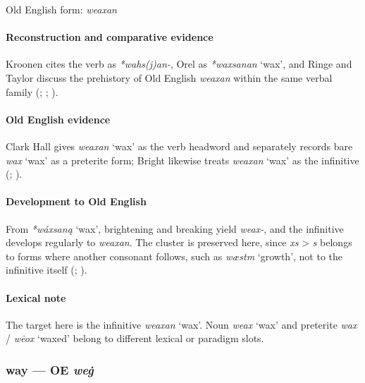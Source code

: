 \documentclass[
  british,
  a4paper,
]{article}
\providecommand{\Recon}[1]{\emph{*#1}}
\begin{document}
Old English form: \emph{weaxan}

\paragraph{Reconstruction and comparative
evidence}\label{reconstruction-and-comparative-evidence-73}

Kroonen cites the verb as \emph{*wahs(j)an-}, Orel as \Recon{waxsanan}
`wax', and Ringe and Taylor discuss the prehistory of Old English
\emph{weaxan} within the same verbal family
(; ; ).

\paragraph{Old English evidence}\label{old-english-evidence-75}

Clark Hall gives \emph{weaxan} `wax' as the verb headword and separately
records bare \emph{wax} `wax' as a preterite form; Bright likewise
treats \emph{weaxan} `wax' as the infinitive
(;
).

\paragraph{Development to Old
English}\label{development-to-old-english-74}

From \Recon{wáxsaną} `wax', brightening and breaking yield \emph{weax-},
and the infinitive develops regularly to \emph{weaxan}. The cluster is
preserved here, since \emph{xs} \textgreater{} \emph{s} belongs to forms
where another consonant follows, such as \emph{wæstm} `growth', not to
the infinitive itself (;
).

\paragraph{Lexical note}\label{lexical-note-3}

The target here is the infinitive \emph{weaxan} `wax'. Noun \emph{weax}
`wax' and preterite \emph{wax} / \emph{wēox} `waxed' belong to different
lexical or paradigm slots.

\subsubsection{\texorpdfstring{way --- OE
\emph{weġ}}{way --- OE weġ}}\label{way-oe-weux121}
\end{document}
